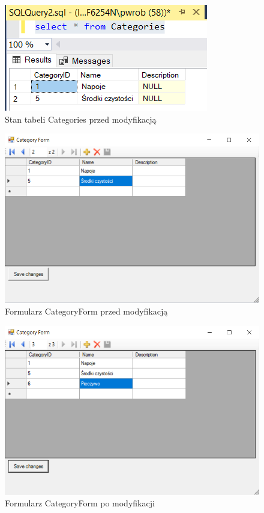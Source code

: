 \documentclass[12pt, a4paper]{mwart}
\begin{document}
\begin{figure}
  \centering
  \includegraphics[scale=0.5]{IV/4-1.png}
  \caption{Stan tabeli Categories przed modyfikacją}
  \label{rys:4.1}
\end{figure}

\begin{figure}
  \centering
  \includegraphics[scale=0.5]{IV/4-2.png}
  \caption{Formularz CategoryForm przed modyfikacją}
  \label{rys:4.2}
\end{figure}

\begin{figure}
  \centering
  \includegraphics[scale=0.5]{IV/4-3.png}
  \caption{Formularz CategoryForm po modyfikacji}
  \label{rys:4.3}
\end{figure}
\end{document}

